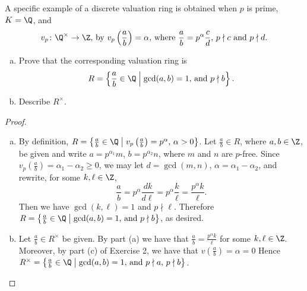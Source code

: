 \documentclass[10pt]{amsart}
\begin{document}
\begin{thm}
  A specific example of a discrete valuation ring is obtained when $p$ is prime, $K = \Q$, and 
  $$v_p \colon \Q^\times \rightarrow \Z,\, \text{by}\  v_p\left(\frac{a}{b}\right) = \alpha,\, \text{where}\  \frac{a}{b} = p^\alpha\frac{c}{d},\, p \nmid c\ \text{and}\ p \nmid d.$$
  \begin{enumerate}[(a)]
  \item
    Prove that the corresponding valuation ring is 
    $$R = \left\{\frac{a}{b} \in \Q \;\middle\vert\; \gcd(a,b) = 1,\, \text{and}\ p\nmid b\right\}.$$
  \item
    Describe $R^\times$.
  \end{enumerate}
  \begin{proof}
    \begin{enumerate}[(a)]
      \item
        By definition, $R = \left\{\frac{a}{b} \in \Q \;\middle\vert\; v_p\left(\frac{a}{b}\right) = p^\alpha,\, \alpha > 0\right\}$.
        Let $\frac{a}{b} \in R$, where $a,b \in \Z$, be given and write $a = p^{\alpha_1}m$, $b = p^{\alpha_2}n$, where $m$ and $n$ are $p$-free.
        Since $v_p(\frac{a}{b}) = \alpha_1 - \alpha_2 \geq 0$, we may let $d = \gcd(m,n)$, $\alpha = \alpha_1 - \alpha_2$, and rewrite, for some $k, \ell \in \Z$, 
        $$\frac{a}{b} = p^{\alpha}\frac{dk}{d\ell} = p^{\alpha}\frac{k}{\ell} = \frac{p^{\alpha}k}{\ell}.$$
        Then we have $\gcd(k,\ell) = 1$ and $p \nmid \ell$.
        Therefore $R = \left\{\frac{a}{b} \in \Q \;\middle\vert\; \gcd(a,b) = 1,\, \text{and}\ p\nmid b\right\}$, as desired.
      \item
        Let $\frac{a}{b} \in R^\times$ be given.
        By part (a) we have that $\frac{a}{b} = \frac{p^\alpha k}{\ell}$ for some $k, \ell \in \Z$.
        Moreover, by part (c) of Exercise 2, we have that $v(\frac{a}{b}) = \alpha = 0$
        Hence $R^\times = \left\{\frac{a}{b} \in \Q \;\middle\vert\; \gcd(a,b) = 1,\, \text{and}\ p \nmid a,\, p\nmid b \right\}$.
    \end{enumerate}
  \end{proof}
\end{thm}
\end{document}
